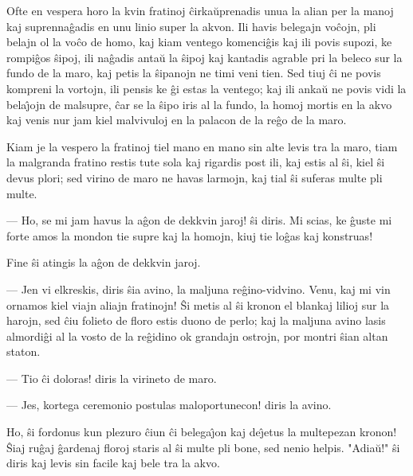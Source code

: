    Ofte en vespera horo la kvin fratinoj \^cirka\u uprenadis unua la alian
per la manoj kaj suprenna\^gadis en unu linio super la akvon. Ili
havis belegajn vo\^cojn, pli belajn ol la vo\^co de homo, kaj kiam
ventego komenci\^gis kaj ili povis supozi, ke rompi\^gos \^sipoj,
ili na\^gadis anta\u u la \^sipoj kaj kantadis agrable pri la beleco
sur la fundo de la maro, kaj petis la \^sipanojn ne timi veni tien.
Sed tiuj \^ci ne povis kompreni la vortojn, ili pensis ke \^gi estas
la ventego; kaj ili anka\u u ne povis vidi la bela\^{\j}ojn de
malsupre, \^car se la \^sipo iris al la fundo, la homoj mortis en la
akvo kaj venis nur jam kiel malvivuloj en la palacon de la re\^go de
la maro.

   Kiam je la vespero la fratinoj tiel mano en mano sin alte levis tra
la maro, tiam la malgranda fratino restis tute sola kaj rigardis
post ili, kaj estis al \^si, kiel \^si devus plori; sed virino de
maro ne havas larmojn, kaj tial \^si suferas multe pli multe.

 --- Ho, se mi jam havus la a\^gon de dekkvin jaroj! \^si diris. Mi
scias, ke \^guste mi forte amos la mondon tie supre kaj la homojn,
kiuj tie lo\^gas kaj konstruas!

   Fine \^si atingis la a\^gon de dekkvin jaroj.

 --- Jen vi elkreskis, diris \^sia avino, la maljuna re\^gino-vidvino.
Venu, kaj mi vin ornamos kiel viajn aliajn fratinojn! \^Si metis al
\^si kronon el blankaj lilioj sur la harojn, sed \^ciu folieto de
floro estis duono de perlo; kaj la maljuna avino lasis almordi\^gi
al la vosto de la re\^gidino ok grandajn ostrojn, por montri \^sian
altan staton.

 --- Tio \^ci doloras! diris la virineto de maro.

 --- Jes, kortega ceremonio postulas maloportunecon! diris la avino.

   Ho, \^si fordonus kun plezuro \^ciun \^ci belega\^{\j}on kaj de\^{\j}etus la
multepezan kronon! \^Siaj ru\^gaj \^gardenaj floroj staris al \^si
multe pli bone, sed nenio helpis. "Adia\u u!" \^si diris kaj levis
sin facile kaj bele tra la akvo.

